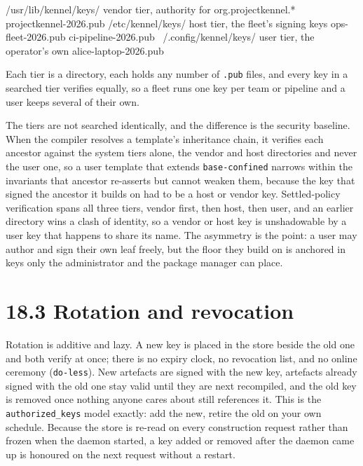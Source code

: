 \begin{kennelcode}
/usr/lib/kennel/keys/       vendor tier, authority for org.projectkennel.*
  projectkennel-2026.pub
/etc/kennel/keys/           host tier, the fleet's signing keys
  ops-fleet-2026.pub
  ci-pipeline-2026.pub
~/.config/kennel/keys/      user tier, the operator's own
  alice-laptop-2026.pub
\end{kennelcode}

Each tier is a directory, each holds any number of \texttt{.pub} files,
and every key in a searched tier verifies equally, so a fleet runs one
key per team or pipeline and a user keeps several of their own.

The tiers are not searched identically, and the difference is the
security baseline. When the compiler resolves a template's inheritance
chain, it verifies each ancestor against the system tiers alone, the
vendor and host directories and never the user one, so a user template
that extends \texttt{base-confined} narrows within the invariants that
ancestor re-asserts but cannot weaken them, because the key that signed
the ancestor it builds on had to be a host or vendor key. Settled-policy
verification spans all three tiers, vendor first, then host, then user,
and an earlier directory wins a clash of identity, so a vendor or host
key is unshadowable by a user key that happens to share its name. The
asymmetry is the point: a user may author and sign their own leaf
freely, but the floor they build on is anchored in keys only the
administrator and the package manager can place.

\hypertarget{rotation-and-revocation}{%
\section{18.3 Rotation and revocation}\label{rotation-and-revocation}}

Rotation is additive and lazy. A new key is placed in the store beside
the old one and both verify at once; there is no expiry clock, no
revocation list, and no online ceremony (\texttt{do-less}). New
artefacts are signed with the new key, artefacts already signed with the
old one stay valid until they are next recompiled, and the old key is
removed once nothing anyone cares about still references it. This is the
\texttt{authorized\_keys} model exactly: add the new, retire the old on
your own schedule. Because the store is re-read on every construction
request rather than frozen when the daemon started, a key added or
removed after the daemon came up is honoured on the next request without
a restart.

